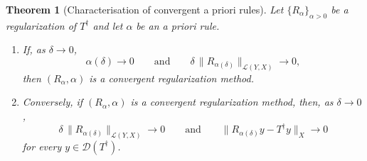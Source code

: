 \documentclass[a4paper]{report}
\theoremstyle{plain}
\newtheorem{theorem}{Theorem}[chapter]
\theoremstyle{definition}
\theoremstyle{remark}
\newcommand{\Ll}{\mathcal{L}}
\newcommand{\Dom}{\mathcal{D}}
\newcommand{\dg}{^{\dagger}}
\begin{document}
\begin{theorem}[Characterisation of convergent a priori rules]
  \label{thm_apriori_characterisation}
  Let $\{R_{\alpha}\}_{\alpha>0}$ be a regularization of $T\dg$ and let $\alpha$ be an a
  priori rule.
  \begin{enumerate}
    \item If, as $\delta \to 0$,
      \[
        \alpha(\delta) \to 0
        \qquad\text{and}\qquad
        \delta\,\|R_{\alpha(\delta)}\|_{\Ll(Y,X)} \to 0 ,
      \]
      then $(R_{\alpha}, \alpha)$ is a convergent regularization method.
    \item Conversely, if $(R_{\alpha}, \alpha)$ is a convergent regularization method,
      then, as $\delta \to 0$,
      \[
        \delta\,\|R_{\alpha(\delta)}\|_{\Ll(Y,X)} \to 0
        \qquad\text{and}\qquad
        \|R_{\alpha(\delta)} y - T\dg y\|_X \to 0
      \]
      for every $y \in \Dom(T\dg)$.
  \end{enumerate}
\end{theorem}
\end{document}
